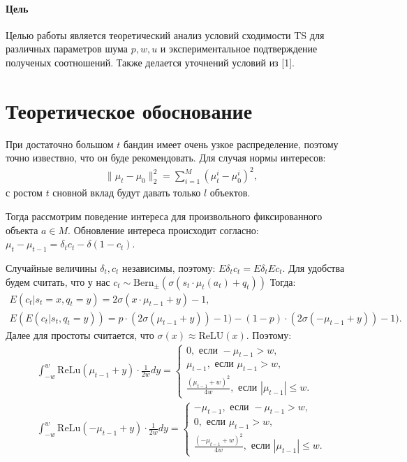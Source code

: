\documentclass[12pt, twoside]{article}
\begin{document}
\paragraph{Цель}
Целью работы является теоретический анализ условий сходимости TS для различных параметров шума $p, w, u$ и экспериментальное подтверждение полученых соотношений. 
Также делается уточнений условий из [1]. 

\section{Теоретическое обоснование}
При достаточно большом $t$ бандин имеет очень узкое распределение, поэтому точно извествно, что он буде рекомендовать.
Для случая нормы интересов: 
\begin{gather*}
  \|\mu_t - \mu_0 \|^2_2 = \sum_{i=1}^M (\mu_t^i - \mu_0^i)^2,
\end{gather*}
с ростом $t$ сновной вклад будут давать только $l$ объектов.

Тогда рассмотрим поведение интереса для произвольного фиксированного объекта $a \in M$. 
Обновление интереса происходит согласно: $\mu_t - \mu_{t-1} = \delta_t c_t - \delta (1 - c_t)$.

Случайные величины $\delta_t, c_t$ независимы, поэтому: $E \delta_t c_t = E \delta_t E c_t$. 
Для удобства будем считать, что у нас $c_t \sim \text{Bern}_{\pm}(\sigma(s_t \cdot \mu_t(a_t) + q_t))$
Тогда: 
\begin{gather*}
  E (c_t | s_t = x, q_t = y) = 2 \sigma(x \cdot \mu_{t-1} + y) - 1, \\
  E (E (c_t | s_t, q_t = y)) = p \cdot (2 \sigma(\mu_{t-1} + y)) - 1) -  (1-p) \cdot (2 \sigma(- \mu_{t-1} + y)) - 1).  
\end{gather*}
Далее для простоты считается, что $\sigma(x) \approx \text{ReLU}(x)$.
Поэтому: 
\begin{gather*}
  \int_{-w}^w \text{ReLu}(\mu_{t-1} + y) \cdot \frac{1}{2 w} dy =  
    \begin{cases} 
      0, \text{ если } -\mu_{t-1} > w, \\
      \mu_{t-1}, \text{ если } \mu_{t-1} > w, \\
      \frac{(\mu_{t-1} + w)^2}{4 w}, \text{ если } |\mu_{t-1}| \leq w.
    \end{cases} \\ 
  \int_{-w}^w \text{ReLu}(-\mu_{t-1} + y) \cdot \frac{1}{2 w} dy =  
    \begin{cases} 
      -\mu_{t-1}, \text{ если } -\mu_{t-1} > w, \\
      0, \text{ если } \mu_{t-1} > w, \\
      \frac{(-\mu_{t-1} + w)^2}{4 w}, \text{ если } |\mu_{t-1}| \leq w.
    \end{cases} 
\end{gather*}
\end{document}
